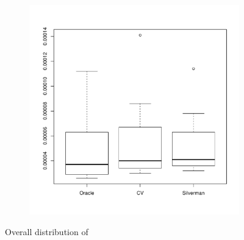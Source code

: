 \begin{figure}[htbp]
\begin{subfigure}[t]{0.45\textwidth}
        \includegraphics[width=\textwidth]{results/by_overall/normalized-miae-peakpop-boxplot}
        \label{fig:discussion:overall_nmiae_boxplot:peak}
    \end{subfigure}
    \caption{Overall distribution of }
    \label{fig:discussion:overall_nmiae_boxplot}
\end{figure}

